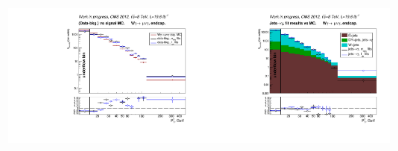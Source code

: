 \begin{frame}
\begin{figure}[htb]
\begin{center}
    \includegraphics[width=0.45\textwidth]{../figs/figs_v11/MUON_WGamma/PrepareYields/c_BkgSubtrDATAvsSIGMC_c_MUON_WGamma__UNblind__Endcap__phoEt.pdf}\includegraphics[width=0.45\textwidth]{../figs/figs_v11/MUON_WGamma/PrepareYields/c_FakeDDvsMC_c_MUON_WGamma__UNblind__Endcap__phoEt.pdf}\\
    \end{center}
  \end{figure}
\end{frame}%

